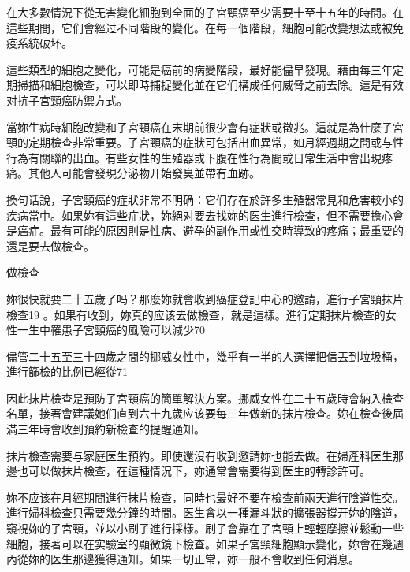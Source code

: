 \documentclass[12pt,UTF8]{ctexbook}
\begin{document}
在大多數情況下從无害變化細胞到全面的子宮頸癌至少需要十至十五年的時間。在這些期間，它们會經过不同階段的變化。在每一個階段，細胞可能改變想法或被免疫系統破坏。

這些類型的細胞之變化，可能是癌前的病變階段，最好能儘早發現。藉由每三年定期掃描和細胞檢查，可以即時捕捉變化並在它们構成任何威脅之前去除。這是有效对抗子宮頸癌防禦方式。

當妳生病時細胞改變和子宮頸癌在末期前很少會有症狀或徵兆。這就是為什麼子宮頸的定期檢查非常重要。子宮頸癌的症狀可包括出血異常，如月經週期之間或与性行為有關聯的出血。有些女性的生殖器或下腹在性行為間或日常生活中會出現疼痛。其他人可能會發現分泌物开始發臭並帶有血跡。

換句话說，子宮頸癌的症狀非常不明确：它们存在於許多生殖器常見和危害較小的疾病當中。如果妳有這些症狀，妳絕对要去找妳的医生進行檢查，但不需要擔心會是癌症。最有可能的原因則是性病、避孕的副作用或性交時導致的疼痛；最重要的還是要去做檢查。





做檢查




妳很快就要二十五歲了吗？那麼妳就會收到癌症登記中心的邀請，進行子宮頸抹片檢查19 。如果有收到，妳真的应该去做檢查，就是這樣。進行定期抹片檢查的女性一生中罹患子宮頸癌的風險可以減少70%

儘管二十五至三十四歲之間的挪威女性中，幾乎有一半的人選擇把信丟到垃圾桶，進行篩檢的比例已經從71%

因此抹片檢查是預防子宮頸癌的簡單解決方案。挪威女性在二十五歲時會納入檢查名單，接著會建議她们直到六十九歲应该要每三年做新的抹片檢查。妳在檢查後屆滿三年時會收到預約新檢查的提醒通知。

抹片檢查需要与家庭医生預約。即使還沒有收到邀請妳也能去做。在婦產科医生那邊也可以做抹片檢查，在這種情況下，妳通常會需要得到医生的轉診許可。

妳不应该在月經期間進行抹片檢查，同時也最好不要在檢查前兩天進行陰道性交。進行婦科檢查只需要幾分鐘的時間。医生會以一種漏斗狀的擴張器撐开妳的陰道，窺視妳的子宮頸，並以小刷子進行採樣。刷子會靠在子宮頸上輕輕摩擦並鬆動一些細胞，接著可以在实驗室的顯微鏡下檢查。如果子宮頸細胞顯示變化，妳會在幾週內從妳的医生那邊獲得通知。如果一切正常，妳一般不會收到任何消息。
\end{document}
